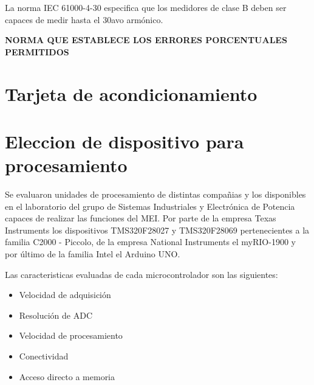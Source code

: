   La norma IEC 61000-4-30 especifica que los medidores de clase B deben ser capaces
  de medir hasta el 30avo armónico.

  \textbf{NORMA QUE ESTABLECE LOS ERRORES PORCENTUALES PERMITIDOS}

\section{Tarjeta de acondicionamiento}%


\section{Eleccion de dispositivo para procesamiento}%
  \par Se evaluaron unidades de procesamiento de distintas compañias y los
  disponibles en el laboratorio del grupo de Sistemas Industriales y Electrónica
  de Potencia capaces de realizar las funciones del MEI. Por parte de la empresa
  Texas Instruments los dispositivos TMS320F28027 y TMS320F28069 pertenecientes
  a la familia C2000 - Piccolo, de la empresa National Instruments el myRIO-1900
  y por último de la familia Intel el Arduino UNO.

  Las caracteristicas evaluadas de cada microcontrolador son las siguientes:
  \begin{itemize}
   \item Velocidad de adquisición
   \item Resolución de ADC
   \item Velocidad de procesamiento
   \item Conectividad
   \item Acceso directo a memoria
  \end{itemize}

